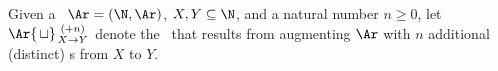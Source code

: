 Given a \hgraph\ $\Ar = (\N, \Ar)$, 
$X, Y \subseteq\N$,  and a natural number $n \ge 0$,
\gdef\ArXY#1{%
        \Ar{\,\sqcup}\genfrac{}{}{0pt}{}{(+#1)}{X{\to}Y}
    }%
    let $\ArXY n$ 
        denote the \hgraph\ that results from augmenting $\Ar$ with $n$
    additional (distinct) \arc s from $X$ to $Y$.
